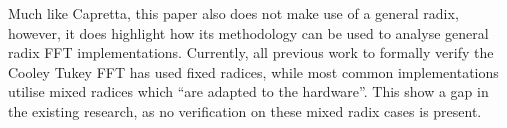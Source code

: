 Much like Capretta\cite{Capretta2001}, this paper also does not make use of 
a general radix, however, it does highlight how its methodology can be used to 
analyse general radix FFT implementations.
Currently, all previous work to formally verify the Cooley Tukey FFT has used 
fixed radices, while most common implementations utilise mixed radices which 
``are adapted to the hardware''\cite{Frigo2005}.
This show a gap in the existing research, as no verification on these mixed
radix cases is present.
